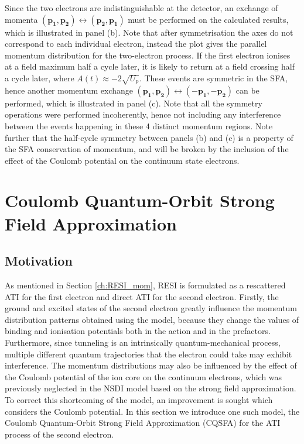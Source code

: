 \documentclass[11pt]{article}
\numberwithin{equation}{section}
\begin{document}
Since the two electrons are indistinguishable at the detector, an exchange of momenta $(\mathbf{p_1}, \mathbf{p_2})\leftrightarrow(\mathbf{p_2}, \mathbf{p_1})$ must be performed on the calculated results, which is illustrated in panel (b). Note that after symmetrisation the axes do not correspond to each individual electron, instead the plot gives the parallel momentum distribution for the two-electron process. If the first electron ionises at a field maximum half a cycle later, it is likely to return at a field crossing half a cycle later, where $A(t) \approx -2 \sqrt{U_p}$. These events are symmetric in the SFA, hence another momentum exchange $(\mathbf{p_1}, \mathbf{p_2}) \leftrightarrow (-\mathbf{p_1}, -\mathbf{p_2})$ can be performed, which is illustrated in panel (c). Note that all the symmetry operations were performed incoherently, hence not including any interference between the events happening in these 4 distinct momentum regions. Note further that the half-cycle symmetry between panels (b) and (c) is a property of the SFA conservation of momentum, and will be broken by the inclusion of the effect of the Coulomb potential on the continuum state electrons.

\section{Coulomb Quantum-Orbit Strong Field Approximation} \label{ch:CQSFA}
\subsection{Motivation}
As mentioned in Section \ref{ch:RESI_mom}, RESI is formulated as a rescattered ATI for the first electron and direct ATI for the second electron. Firstly, the ground and excited states of the second electron greatly influence the momentum distribution patterns obtained using the model, because they change the values of binding and ionisation potentials both in the action and in the prefactors. Furthermore, since tunneling is an intrinsically quantum-mechanical process, multiple different quantum trajectories that the electron could take may exhibit interference. The momentum distributions may also be influenced by the effect of the Coulomb potential of the ion core on the continuum electrons, which was previously neglected in the NSDI model based on the strong field approximation. To correct this shortcoming of the model, an improvement is sought which considers the Coulomb potential. In this section we introduce one such model, the Coulomb Quantum-Orbit Strong Field Approximation (CQSFA) for the ATI process of the second electron. 
\end{document}
